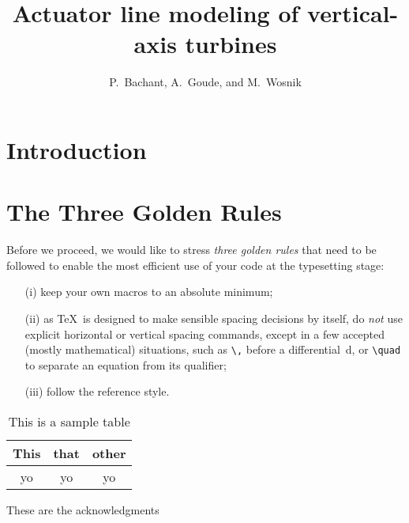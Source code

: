 \documentclass[times]{weauth}
\begin{document}


\title{Actuator line modeling of vertical-axis turbines}

\author{P.~Bachant, A.~Goude, and M.~Wosnik}

\address{Center for Ocean Renewable Energy, University of New Hampshire, 24
Colovos Rd., Durham, NH, 03824, USA}


\begin{abstract}
\end{abstract}


\maketitle


\section{Introduction}

\section{The Three Golden Rules}

Before we proceed, we would like to stress \emph{three golden
rules} that need to be followed to enable the most efficient use
of your code at the typesetting stage:
\begin{enumerate}
\item[(i)] keep your own macros to an absolute minimum;

\item[(ii)] as \TeX\ is designed to make sensible spacing
decisions by itself, do \emph{not} use explicit horizontal or
vertical spacing commands, except in a few accepted (mostly
mathematical) situations, such as \verb"\," before a
differential~d, or \verb"\quad" to separate an equation from its
qualifier;

\item[(iii)] follow the \emph{\journalnamelc} reference style.
\end{enumerate}

\begin{table}
    \caption{This is a sample table}
    \centering
    \small
    \begin{tabular}{c|c|c}
    \toprule
    This & that & other\\
    \midrule
    yo & yo & yo\\
    \bottomrule
    \end{tabular}
\end{table}


\acks These are the acknowledgments



\end{document}
